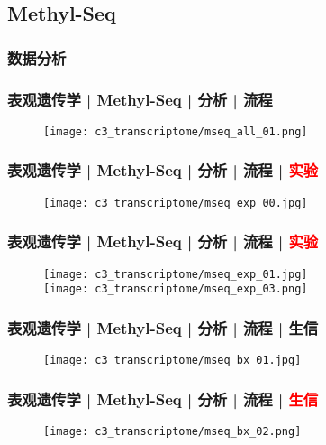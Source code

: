 \subsection{Methyl-Seq}
\subsubsection{数据分析}
\begin{frame}
  \frametitle{表观遗传学 | Methyl-Seq | 分析 | 流程}
  \begin{figure}
    \centering
    \texttt{[image: c3\_transcriptome/mseq\_all\_01.png]}
  \end{figure}
\end{frame}

\begin{frame}
  \frametitle{表观遗传学 | Methyl-Seq | 分析 | 流程 | \textcolor{red}{实验}}
  \begin{figure}
    \centering
    \texttt{[image: c3\_transcriptome/mseq\_exp\_00.jpg]}
  \end{figure}
\end{frame}

\begin{frame}
  \frametitle{表观遗传学 | Methyl-Seq | 分析 | 流程 | \textcolor{red}{实验}}
  \begin{figure}
    \centering
    \texttt{[image: c3\_transcriptome/mseq\_exp\_01.jpg]}\\
    \vspace{1em}
    \texttt{[image: c3\_transcriptome/mseq\_exp\_03.png]}
  \end{figure}
\end{frame}

\begin{frame}
  \frametitle{表观遗传学 | Methyl-Seq | 分析 | 流程 | 生信}
  \begin{figure}
    \centering
    \texttt{[image: c3\_transcriptome/mseq\_bx\_01.jpg]}
  \end{figure}
\end{frame}

\begin{frame}
  \frametitle{表观遗传学 | Methyl-Seq | 分析 | 流程 | \textcolor{red}{生信}}
  \begin{figure}
    \centering
    \texttt{[image: c3\_transcriptome/mseq\_bx\_02.png]}
  \end{figure}
\end{frame}

